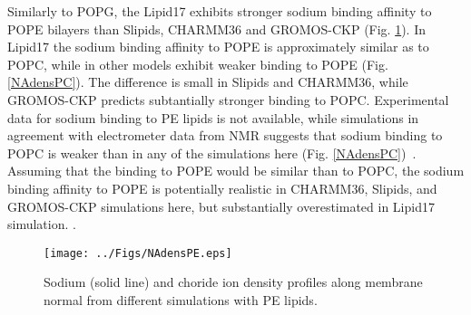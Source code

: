\documentclass[aps,prl,superscriptaddress,twocolumn]{revtex4}
\begin{document}
Similarly to POPG, the Lipid17 exhibits stronger sodium binding affinity
to POPE bilayers than Slipids, CHARMM36 and GROMOS-CKP (Fig. \ref{NAdensPE}).
In Lipid17 the sodium binding affinity to POPE is approximately similar as to POPC,
while in other models exhibit weaker binding to POPE (Fig. \ref{NAdensPC}).
The difference is small in Slipids and CHARMM36, while GROMOS-CKP predicts
subtantially stronger binding to POPC.
Experimental data for sodium binding to PE lipids is not available, while
simulations in agreement with electrometer data from NMR suggests that
sodium binding to POPC is weaker than in any of the simulations
here (Fig. \ref{NAdensPC})~\cite{catte16,melcr18}. Assuming that the binding
to POPE would be similar than to POPC, the sodium binding affinity to POPE
is potentially realistic in CHARMM36, Slipids, and GROMOS-CKP simulations here,
but substantially overestimated in Lipid17 simulation.
.
\begin{figure}[]
  \centering
  \texttt{[image: ../Figs/NAdensPE.eps]}
  \caption{\label{NAdensPE}
    Sodium (solid line) and choride ion density profiles along membrane normal
    from different simulations with PE lipids.
  }
\end{figure}






\clearpage
\end{document}

